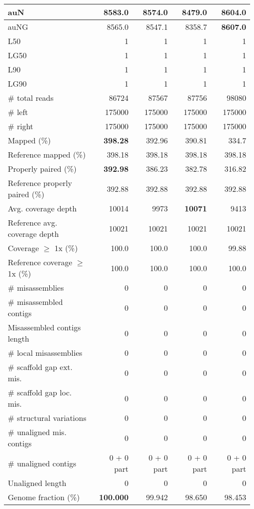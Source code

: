 \documentclass[12pt,a4paper]{article}
\begin{document}
\begin{table}[ht]
\begin{center}
\begin{tabular}{|l*{4}{|r}|}
auN & 8583.0 & 8574.0 & 8479.0 & {\bf 8604.0} \\ \hline
auNG & 8565.0 & 8547.1 & 8358.7 & {\bf 8607.0} \\ \hline
L50 & 1 & 1 & 1 & 1 \\ \hline
LG50 & 1 & 1 & 1 & 1 \\ \hline
L90 & 1 & 1 & 1 & 1 \\ \hline
LG90 & 1 & 1 & 1 & 1 \\ \hline
\# total reads & 86724 & 87567 & 87756 & 98080 \\ \hline
\# left & 175000 & 175000 & 175000 & 175000 \\ \hline
\# right & 175000 & 175000 & 175000 & 175000 \\ \hline
Mapped (\%) & {\bf 398.28} & 392.96 & 390.81 & 334.7 \\ \hline
Reference mapped (\%) & 398.18 & 398.18 & 398.18 & 398.18 \\ \hline
Properly paired (\%) & {\bf 392.98} & 386.23 & 382.78 & 316.82 \\ \hline
Reference properly paired (\%) & 392.88 & 392.88 & 392.88 & 392.88 \\ \hline
Avg. coverage depth & 10014 & 9973 & {\bf 10071} & 9413 \\ \hline
Reference avg. coverage depth & 10021 & 10021 & 10021 & 10021 \\ \hline
Coverage $\geq$ 1x (\%) & 100.0 & 100.0 & 100.0 & 99.88 \\ \hline
Reference coverage $\geq$ 1x (\%) & 100.0 & 100.0 & 100.0 & 100.0 \\ \hline
\# misassemblies & 0 & 0 & 0 & 0 \\ \hline
\# misassembled contigs & 0 & 0 & 0 & 0 \\ \hline
Misassembled contigs length & 0 & 0 & 0 & 0 \\ \hline
\# local misassemblies & 0 & 0 & 0 & 0 \\ \hline
\# scaffold gap ext. mis. & 0 & 0 & 0 & 0 \\ \hline
\# scaffold gap loc. mis. & 0 & 0 & 0 & 0 \\ \hline
\# structural variations & 0 & 0 & 0 & 0 \\ \hline
\# unaligned mis. contigs & 0 & 0 & 0 & 0 \\ \hline
\# unaligned contigs & 0 + 0 part & 0 + 0 part & 0 + 0 part & 0 + 0 part \\ \hline
Unaligned length & 0 & 0 & 0 & 0 \\ \hline
Genome fraction (\%) & {\bf 100.000} & 99.942 & 98.650 & 98.453 \\ \hline

\end{tabular}
\end{center}
\end{table}
\end{document}

